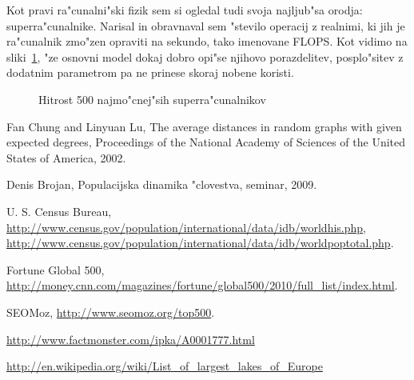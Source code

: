 \documentclass[a4paper,10pt]{article}
\begin{document}
Kot pravi ra"cunalni"ski fizik sem si ogledal tudi svoja najljub"sa orodja: superra"cunalnike. Narisal in obravnaval sem "stevilo operacij z realnimi, ki jih je ra"cunalnik zmo"zen opraviti na sekundo, tako imenovane FLOPS. Kot vidimo na sliki~\ref{fig:comp}, "ze osnovni model dokaj dobro opi"se njihovo porazdelitev, posplo"sitev z dodatnim parametrom pa ne prinese skoraj nobene koristi. 

\begin{figure}[!h]
 
\caption{Hitrost 500 najmo"cnej"sih superra"cunalnikov}
\label{fig:comp}
\end{figure}


\newpage
\begin{thebibliography}{}
  Fan Chung and Linyuan Lu, The average distances in random graphs with given expected degrees, 
Proceedings of the National Academy of Sciences of the United States of America, 2002.

  Denis Brojan, Populacijska dinamika "clovestva, seminar, 2009.

   U. S. Census Bureau, \url{http://www.census.gov/population/international/data/idb/worldhis.php}, \url{http://www.census.gov/population/international/data/idb/worldpoptotal.php}. 

   Fortune Global 500, \url{http://money.cnn.com/magazines/fortune/global500/2010/full_list/index.html}. 

   SEOMoz, \url{http://www.seomoz.org/top500}. 

   \url{http://www.factmonster.com/ipka/A0001777.html}

   \url{http://en.wikipedia.org/wiki/List_of_largest_lakes_of_Europe}
\end{thebibliography}
\end{document}
